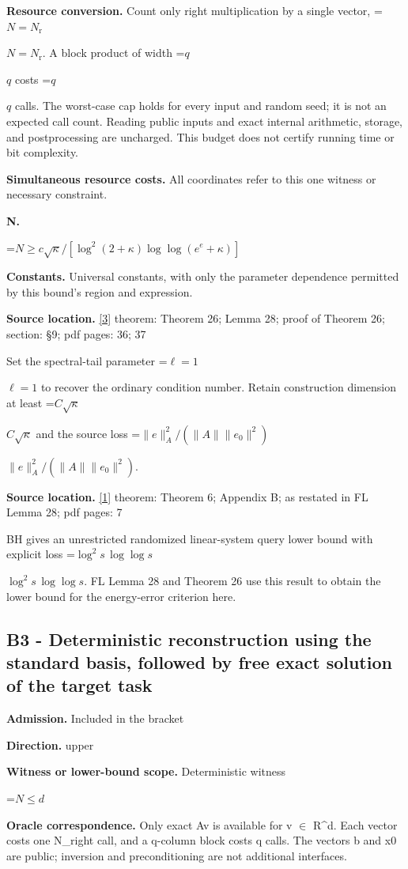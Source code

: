 \documentclass[10pt,a4paper]{article}
\newcommand{\AtlasMath}[1]{\par\begingroup\centering\setbox0=\hbox{$\displaystyle #1$}\ifdim\wd0>1.4\linewidth\typeout{ATLAS WIDE FORMULA: \the\wd0}\fi\ifdim\wd0>\linewidth\resizebox{\linewidth}{!}{\box0}\else\box0\fi\par\endgroup}
\newcommand{\AtlasInlineMath}[1]{\begingroup\setbox0=\hbox{$#1$}\ifdim\wd0>.4\linewidth\endgroup\AtlasMath{#1}\else\endgroup$#1$\fi}
\begin{document}
\textbf{Resource conversion.} Count only right multiplication by a single vector, \AtlasInlineMath{N=N_{\mathrm r}}. A block product of width \AtlasInlineMath{q} costs \AtlasInlineMath{q} calls. The worst-case cap holds for every input and random seed; it is not an expected call count. Reading public inputs and exact internal arithmetic, storage, and postprocessing are uncharged. This budget does not certify running time or bit complexity.

\textbf{Simultaneous resource costs.} All coordinates refer to this one witness or necessary constraint.

\textbf{N.}

\AtlasMath{N\ge c\sqrt\kappa/[\log^2(2+\kappa)\log\log(e^e+\kappa)]}
\textbf{Constants.} Universal constants, with only the parameter dependence permitted by this bound’s region and expression.

\textbf{Source location.} \href{https://jmlr.org/papers/volume26/24-1906/24-1906.pdf}{[3]} theorem: Theorem 26; Lemma 28; proof of Theorem 26; section: §9; pdf pages: 36; 37

Set the spectral-tail parameter \AtlasInlineMath{\ell=1} to recover the ordinary condition number. Retain construction dimension at least \AtlasInlineMath{C\sqrt\kappa} and the source loss \AtlasInlineMath{\|e\|_A^2/(\|A\|\|e_0\|^2)}.

\textbf{Source location.} \href{https://proceedings.mlr.press/v125/braverman20a/braverman20a.pdf}{[1]} theorem: Theorem 6; Appendix B; as restated in FL Lemma 28; pdf pages: 7

BH gives an unrestricted randomized linear-system query lower bound with explicit loss \AtlasInlineMath{\log^2s\,\log\log s}. FL Lemma 28 and Theorem 26 use this result to obtain the lower bound for the energy-error criterion here.

\subsection{B3 - Deterministic reconstruction using the standard basis, followed by free exact solution of the target task}
\textbf{Admission.} Included in the bracket

\textbf{Direction.} upper

\textbf{Witness or lower-bound scope.} Deterministic witness

\AtlasMath{N\le d}
\textbf{Oracle correspondence.} Only exact Av is available for v $\in$ R\textasciicircum{}d. Each vector costs one N\_right call, and a q-column block costs q calls. The vectors b and x0 are public; inversion and preconditioning are not additional interfaces.
\end{document}
